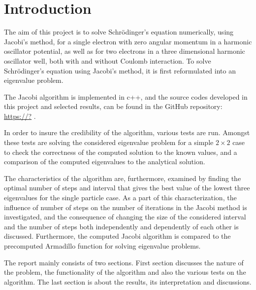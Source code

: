 \chapter{Introduction}

The aim of this project is to solve Schr\"{o}dinger's equation numerically, using Jacobi's method, for a single electron with zero angular momentum in a harmonic oscillator potential, as well as for two electrons in a three dimensional harmonic oscillator well, both with and without Coulomb interaction.  
To solve Schr\"{o}dinger's equation using Jacobi's method, it is first reformulated into an eigenvalue problem. 

The Jacobi algorithm is implemented in c++, and the source codes developed in this project and selected results, can be found in the GitHub repository: \url{https://?} . 

In order to insure the credibility of the algorithm, various tests  are run.
Amongst these tests are solving the considered eigenvalue problem for a simple $2\times 2$ case to check the correctness of the computed solution to the known values, and a comparison of the computed eigenvalues to the analytical solution.  

The characteristics of the algorithm are, furthermore, examined by finding the optimal number of steps and interval that gives the best value of the lowest three eigenvalues for the single particle case.
As a part of this characterization, the influence of number of steps on the number of iterations in the Jacobi method is investigated, and the consequence of changing the size of the considered interval and the number of steps both independently and dependently of each other is discussed.  
Furthermore, the computed Jacobi algorithm is compared to the precomputed Armadillo function for solving eigenvalue problems.

The report mainly consists of two sections. First section discusses  the nature of the problem, the functionality of the algorithm and also the various tests on the algorithm.  The last section is about the results, its interpretation and discussions.





